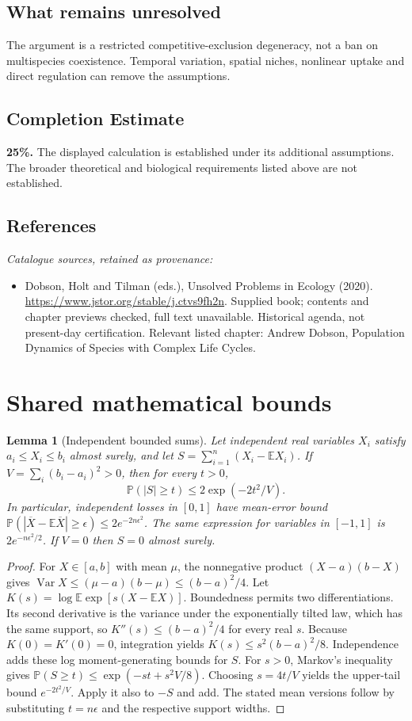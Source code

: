 \documentclass[11pt]{article}
\newcommand{\E}{\mathbb E}
\newcommand{\Prob}{\mathbb P}
\DeclareMathOperator{\Var}{Var}
\providecommand{\E}{\mathbb E}
\providecommand{\Prob}{\mathbb P}
\providecommand{\Var}{\operatorname{Var}}
\newtheorem{sharedlemma}{Lemma}[section]
\begin{document}
\subsection{What remains unresolved}
The argument is a restricted competitive-exclusion degeneracy, not a ban on multispecies coexistence. Temporal variation, spatial niches, nonlinear uptake and direct regulation can remove the assumptions.
\subsection{Completion Estimate}
\textbf{25\%.} The displayed calculation is established under its additional assumptions. The broader theoretical and biological requirements listed above are not established.
\subsection{References}
\noindent\emph{Catalogue sources, retained as provenance:}
\begin{itemize}
\item Dobson, Holt and Tilman (eds.), Unsolved Problems in Ecology (2020). \url{https://www.jstor.org/stable/j.ctvs9fh2n}. Supplied book; contents and chapter previews checked, full text unavailable. Historical agenda, not present-day certification. Relevant listed chapter: Andrew Dobson, Population Dynamics of Species with Complex Life Cycles.
\end{itemize}
\clearpage


\appendix
\section{Shared mathematical bounds}\label{app:bounds}
\begin{sharedlemma}[Independent bounded sums]\label{lem:bounded}
Let independent real variables $X_i$ satisfy $a_i\leq X_i\leq b_i$ almost surely,
and let $S=\sum_{i=1}^n(X_i-\E X_i)$. If
$V=\sum_i(b_i-a_i)^2>0$, then for every $t>0$,
\[
 \Prob(|S|\geq t)\leq 2\exp(-2t^2/V).
\]
In particular, independent losses in $[0,1]$ have mean-error bound
$\Prob(|\overline X-\E\overline X|\geq\epsilon)
\leq2e^{-2n\epsilon^2}$. The same expression for variables in $[-1,1]$
is $2e^{-n\epsilon^2/2}$. If $V=0$ then $S=0$ almost surely.
\end{sharedlemma}
\begin{proof}
For $X\in[a,b]$ with mean $\mu$, the nonnegative product
$(X-a)(b-X)$ gives
$\Var X\leq(\mu-a)(b-\mu)\leq(b-a)^2/4$.
Let $K(s)=\log\E\exp[s(X-\E X)]$.
Boundedness permits two differentiations. Its second derivative is the variance
under the exponentially tilted law, which has the same support, so
$K''(s)\leq(b-a)^2/4$ for every real $s$.
Because $K(0)=K'(0)=0$, integration yields
$K(s)\leq s^2(b-a)^2/8$.
Independence adds these log moment-generating bounds for $S$.
For $s>0$, Markov's inequality gives
$\Prob(S\geq t)\leq\exp(-st+s^2V/8)$.
Choosing $s=4t/V$ yields the upper-tail bound $e^{-2t^2/V}$.
Apply it also to $-S$ and add. The stated mean versions follow by substituting
$t=n\epsilon$ and the respective support widths.
\end{proof}
\end{document}
